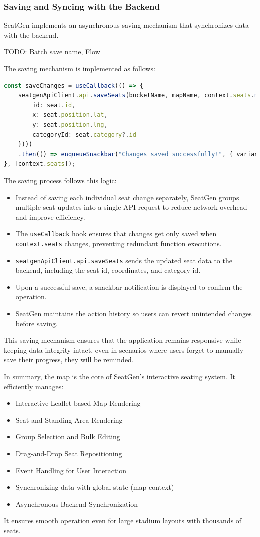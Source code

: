 \subsubsection{Saving and Syncing with the Backend}
SeatGen implements an asynchronous saving mechanism that synchronizes data with the backend.

TODO: Batch save name, Flow

The saving mechanism is implemented as follows:
\begin{lstlisting}[language=TypeScript, caption=Save Mechanism, label=lst:batch-save-seats]
const saveChanges = useCallback(() => {
    seatgenApiClient.api.saveSeats(bucketName, mapName, context.seats.map(seat => ({
        id: seat.id,
        x: seat.position.lat,
        y: seat.position.lng,
        categoryId: seat.category?.id
    })))
    .then(() => enqueueSnackbar("Changes saved successfully!", { variant: "success" }));
}, [context.seats]);
\end{lstlisting}

The saving process follows this logic:
\begin{itemize}
    \item Instead of saving each individual seat change separately, SeatGen groups multiple seat updates into a single API request to reduce network overhead and improve efficiency.
    \item The \texttt{useCallback} hook ensures that changes get only saved when \texttt{context.seats} changes, preventing redundant function executions.
    \item \texttt{seatgenApiClient.api.saveSeats} sends the updated seat data to the backend, including the seat id, coordinates, and category id.
    \item Upon a successful save, a snackbar notification is displayed to confirm the operation.
    \item SeatGen maintains the action history so users can revert unintended changes before saving.
\end{itemize}

This saving mechanism ensures that the application remains responsive while keeping data integrity intact, even in scenarios where users forget to manually save their progress, they will be reminded.

In summary, the map is the core of SeatGen’s interactive seating system. It efficiently manages:
\begin{itemize}
    \item Interactive Leaflet-based Map Rendering
    \item Seat and Standing Area Rendering
    \item Group Selection and Bulk Editing
    \item Drag-and-Drop Seat Repositioning
    \item Event Handling for User Interaction
    \item Synchronizing data with global state (map context)
    \item Asynchronous Backend Synchronization
\end{itemize}

It ensures smooth operation even for large stadium layouts with thousands of seats.

